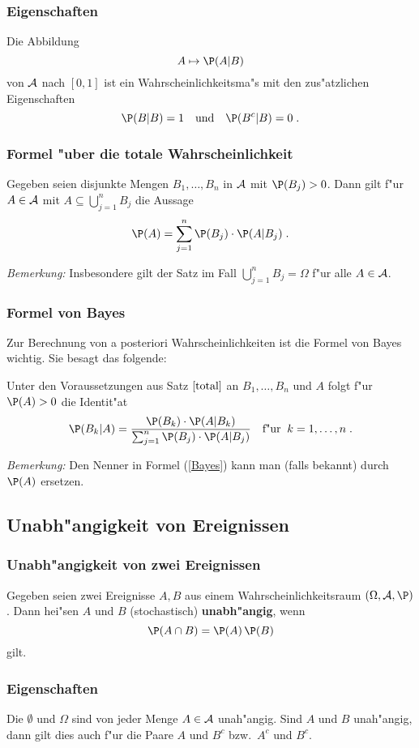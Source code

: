 \subsubsection{Eigenschaften}
\begin{thm}
Die Abbildung
$$
A\mapsto \P(A|B)
$$
von $\mathcal A$ nach $[0,1]$ ist ein Wahrscheinlichkeitsma"s mit den zus"atzlichen Eigenschaften
$$
\P(B|B)=1\quad\mbox{und}\quad\P(B^c|B)=0\;.
$$
\end{thm}
\subsubsection{Formel "uber die totale Wahrscheinlichkeit}
\begin{thm}
\label{total}
Gegeben seien disjunkte Mengen $B_1,\ldots,B_n$ in $\mathcal A$ mit
$\P(B_j)>0$. Dann gilt f"ur $A\in \mathcal A$ mit $A\subseteq\bigcup_{j=1}^n B_j$
die Aussage
$$
\P(A)=\sum_{j=1}^n\P(B_j)\cdot\P(A|B_j)\;.
$$
\end{thm}
\textit{Bemerkung:} Insbesondere gilt der Satz im Fall $\bigcup_{j=1}^n B_j=\Omega$
f"ur alle $A\in\mathcal A$.
\subsubsection{Formel von Bayes}
Zur Berechnung von a posteriori Wahrscheinlichkeiten ist die Formel von
Bayes wichtig. Sie besagt das folgende$\colon$
\begin{thm}
Unter den Voraussetzungen aus Satz $\ref{total}$ an $B_1,\ldots,B_n$ und $A$ folgt
f"ur
$\P(A)>0$ die Identit"at
\begin{equation}
\label{Bayes}
\P(B_k|A)=\frac{\P(B_k)\cdot\P(A|B_k)}{\sum_{j=1}^n
\P(B_j)\cdot\P(A|B_j)}\quad\mbox{f"ur}\;\;k=1,\ldots,n\;.
\end{equation}
\end{thm}
\textit{Bemerkung:} Den Nenner in Formel (\ref{Bayes}) kann man (falls bekannt) durch $\P(A)$
ersetzen.
\subsection{Unabh"angigkeit von Ereignissen}
\subsubsection{Unabh"angigkeit von zwei Ereignissen}
Gegeben seien zwei Ereignisse $A,B$ aus einem Wahrscheinlichkeitsraum $(\Omega,\fr A,\P)$.
Dann hei"sen $A$ und $B$ (stochastisch) \textbf{unabh"angig}, wenn
$$
\P(A\cap B)=\P(A)\,\P(B)
$$
gilt.
\subsubsection{Eigenschaften}
Die $\emptyset$ und $\Omega$ sind von jeder Menge $A\in\mathcal A$ unah"angig. Sind
$A$ und $B$ unah"angig, dann gilt dies auch f"ur die Paare $A$ und $B^c$ bzw.~$A^c$ und $B^c$.
